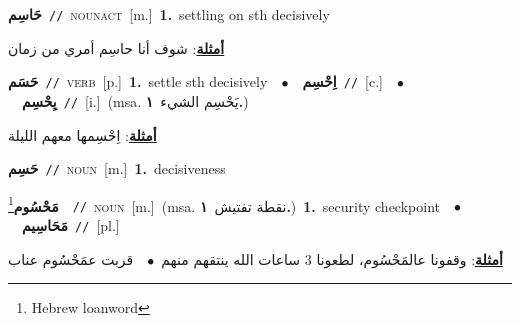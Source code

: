 \documentclass[10pt,a4paper,twoside]{article} %
\begin{document}
\begin{multicols}{2}
{\setlength\topsep{0pt}\textbf{\foreignlanguage{arabic}{حَاسِم}}\ {\color{gray}\texttt{//}\color{black}}\ \textsc{noun\textunderscore act}\ [m.]\ \textbf{1.}~settling on sth decisively\  \begin{flushright}\color{gray}\foreignlanguage{arabic}{\textbf{\underline{\foreignlanguage{arabic}{أمثلة}}}: شوف أنا حاسِم أمري من زمان}\end{flushright}\color{black}} \vspace{2mm}

{\setlength\topsep{0pt}\textbf{\foreignlanguage{arabic}{حَسَم}}\ {\color{gray}\texttt{//}\color{black}}\ \textsc{verb}\ [p.]\ \textbf{1.}~settle sth decisively\ \ $\bullet$\ \ \setlength\topsep{0pt}\textbf{\foreignlanguage{arabic}{اِحْسِم}}\ {\color{gray}\texttt{//}\color{black}}\ [c.]\ \ $\bullet$\ \ \setlength\topsep{0pt}\textbf{\foreignlanguage{arabic}{يِحْسِم}}\ {\color{gray}\texttt{//}\color{black}}\ [i.]\ \color{gray}(msa. \foreignlanguage{arabic}{يَحْسِم الشيء}~\foreignlanguage{arabic}{\textbf{١.}})\color{black}\  \begin{flushright}\color{gray}\foreignlanguage{arabic}{\textbf{\underline{\foreignlanguage{arabic}{أمثلة}}}: اِحْسِمها معهم الليلة}\end{flushright}\color{black}} \vspace{2mm}

{\setlength\topsep{0pt}\textbf{\foreignlanguage{arabic}{حَسِم}}\ {\color{gray}\texttt{//}\color{black}}\ \textsc{noun}\ [m.]\ \textbf{1.}~decisiveness\ } \vspace{2mm}

{\setlength\topsep{0pt}\textbf{\foreignlanguage{arabic}{مَحْسُوم}}\footnote{Hebrew loanword}\ \ {\color{gray}\texttt{//}\color{black}}\ \textsc{noun}\ [m.]\ \color{gray}(msa. \foreignlanguage{arabic}{نقطة تفتيش}~\foreignlanguage{arabic}{\textbf{١.}})\color{black}\ \textbf{1.}~security checkpoint\ \ $\bullet$\ \ \setlength\topsep{0pt}\textbf{\foreignlanguage{arabic}{مَحَاسِيم}}\ {\color{gray}\texttt{//}\color{black}}\ [pl.]\  \begin{flushright}\color{gray}\foreignlanguage{arabic}{\textbf{\underline{\foreignlanguage{arabic}{أمثلة}}}: وقفونا عالمَحْسُوم، لطعونا 3 ساعات الله ينتقهم منهم\ $\bullet$\ \  قربت عمَحْسُوم عناب}\end{flushright}\color{black}} \vspace{2mm}


\end{multicols}
\end{document}

